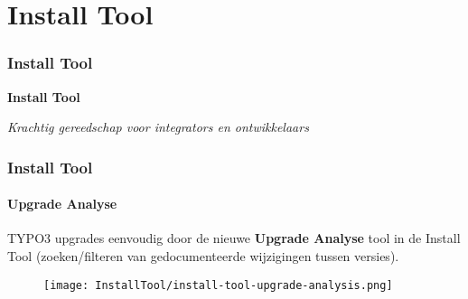 %

\section{Install Tool}
\begin{frame}[fragile]
	\frametitle{Install Tool}

	\begin{center}\huge{\color{typo3darkgrey}\textbf{Install Tool}}\end{center}
	\begin{center}\large{\textit{Krachtig gereedschap voor integrators en ontwikkelaars}}\end{center}

\end{frame}


\begin{frame}[fragile]
	\frametitle{Install Tool}
	\framesubtitle{Upgrade Analyse}


	TYPO3 upgrades eenvoudig door de nieuwe \textbf{Upgrade Analyse} tool
	in de Install Tool (zoeken/filteren van gedocumenteerde wijzigingen tussen versies).

	\begin{figure}
		\texttt{[image: InstallTool/install-tool-upgrade-analysis.png]}
	\end{figure}

\end{frame}

